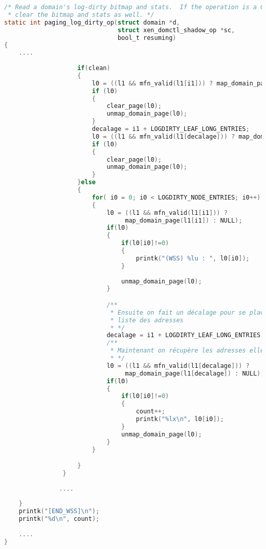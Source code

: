 \begin{lstlisting}[language=C, caption=Portion de code modifiée dans la méthode paging\_log\_dirty\_op, label={lst:paging_log_dirty_op}]
/* Read a domain's log-dirty bitmap and stats.  If the operation is a CLEAN,
 * clear the bitmap and stats as well. */
static int paging_log_dirty_op(struct domain *d,
                               struct xen_domctl_shadow_op *sc,
                               bool_t resuming)
{
    .... 
    
                    if(clean)
                    {
                        l0 = ((l1 && mfn_valid(l1[i1])) ? map_domain_page(l1[i1]) : NULL);
                        if (l0)
                        {
                            clear_page(l0); 
                            unmap_domain_page(l0);
                        }
                        decalage = i1 + LOGDIRTY_LEAF_LONG_ENTRIES;
                        l0 = ((l1 && mfn_valid(l1[decalage])) ? map_domain_page(l1[decalage]) : NULL);
                        if (l0)
                        {
                            clear_page(l0); 
                            unmap_domain_page(l0);
                        }
                    }else
                    {
                        for( i0 = 0; i0 < LOGDIRTY_NODE_ENTRIES; i0++)
                        {
                            l0 = ((l1 && mfn_valid(l1[i1])) ?
                                 map_domain_page(l1[i1]) : NULL);
                            if(l0)
                            {
                                if(l0[i0]!=0)
                                {
                                    printk("(WSS) %lu : ", l0[i0]);
                                }
                                
                                unmap_domain_page(l0);
                            }

                            /**
                             * Ensuite on fait un décalage pour se placer au début de la 
                             * liste des adresses
                             * */
                            decalage = i1 + LOGDIRTY_LEAF_LONG_ENTRIES;
                            /**
                             * Maintenant on récupère les adresses elles-mêmes
                             * */
                            l0 = ((l1 && mfn_valid(l1[decalage])) ?
                                 map_domain_page(l1[decalage]) : NULL);
                            if(l0)
                            {
                                if(l0[i0]!=0)
                                {
                                    count++;
                                    printk("%lx\n", l0[i0]);
                                } 
                                unmap_domain_page(l0);
                            }
                        }

                    }
                }
               
               ....
               
    }
    printk("[END_WSS]\n");
    printk("%d\n", count);
    
    ....
}
\end{lstlisting}

